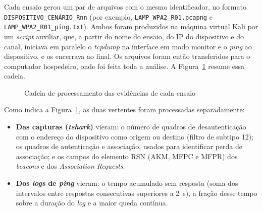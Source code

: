 Cada ensaio gerou um par de arquivos com o mesmo identificador, no formato \texttt{DISPOSITIVO\_CENÁRIO\_Rnn} (por exemplo, \texttt{LAMP\_WPA2\_R01.pcapng} e \texttt{LAMP\_WPA2\_R01\_ping.txt}). Ambos foram produzidos na máquina virtual Kali por um \textit{script} auxiliar, que, a partir do nome do ensaio, do IP do dispositivo e do canal, iniciava em paralelo o \textit{tcpdump} na interface em modo monitor e o \textit{ping} ao dispositivo, e os encerrava ao final. Os arquivos foram então transferidos para o computador hospedeiro, onde foi feita toda a análise. A Figura~\ref{fig:estrutura_evidencias} resume essa cadeia.

\begin{figure}[htb]
\centering
\caption{Cadeia de processamento das evidências de cada ensaio}
\label{fig:estrutura_evidencias}
\end{figure}

Como indica a Figura~\ref{fig:estrutura_evidencias}, as duas vertentes foram processadas separadamente:

\begin{itemize}
    \item \textbf{Das capturas (\textit{tshark})} vieram: o número de quadros de desautenticação com o endereço do dispositivo como origem ou destino (filtro de subtipo 12); os quadros de autenticação e associação, usados para identificar perda de associação; e os campos do elemento RSN (AKM, MFPC e MFPR) dos \textit{beacons} e dos \textit{Association Requests}.
    \item \textbf{Dos \textit{logs} de \textit{ping}} vieram: o tempo acumulado sem resposta (soma dos intervalos entre respostas consecutivas superiores a 2~s), a fração desse tempo sobre a duração do \textit{log} e a maior queda contínua.
\end{itemize}

